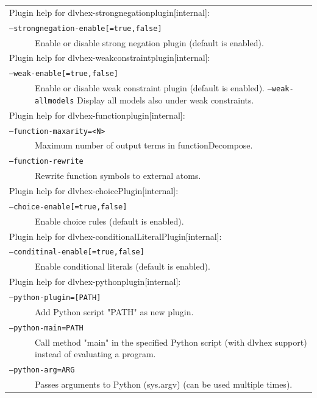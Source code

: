 \documentclass[a4paper, titlepage]{article}
\begin{document}
\begin{center}
\begin{longtable}{p{2.2cm}  p{2.5cm} p{0.6cm} p{6.3cm}  }
\multicolumn{4}{l}{Plugin help for dlvhex-strongnegationplugin[internal]:}\\
\multicolumn{4}{l}{\texttt{--strongnegation-enable[=true,false]}}\\
& & & Enable or disable strong negation plugin (default is enabled).\\ 
\multicolumn{4}{l}{Plugin help for dlvhex-weakconstraintplugin[internal]:}\\
\multicolumn{4}{l}{\texttt{--weak-enable[=true,false]}}\\
& & & Enable or disable weak constraint plugin (default is enabled). \texttt{--weak-allmodels} Display all models also under weak constraints.\\ 
\multicolumn{4}{l}{Plugin help for dlvhex-functionplugin[internal]:}\\
\multicolumn{4}{l}{\texttt{--function-maxarity=<N>}}\\
& & & Maximum number of output terms in functionDecompose.\\ 
\multicolumn{4}{l}{\texttt{--function-rewrite}}\\
& & & Rewrite function symbols to external atoms.\\ 
\multicolumn{4}{l}{Plugin help for dlvhex-choicePlugin[internal]:}\\
\multicolumn{4}{l}{\texttt{--choice-enable[=true,false]}}\\
& & & Enable choice rules (default is enabled).\\
\multicolumn{4}{l}{Plugin help for dlvhex-conditionalLiteralPlugin[internal]:}\\
\multicolumn{4}{l}{\texttt{--conditinal-enable[=true,false]}}\\
& & & Enable conditional literals (default is enabled).\\
\multicolumn{4}{l}{Plugin help for dlvhex-pythonplugin[internal]:}\\
\multicolumn{4}{l}{\texttt{--python-plugin=[PATH]}}\\
& & & Add Python script "PATH" as new plugin.\\
\multicolumn{4}{l}{\texttt{--python-main=PATH}}\\
& & & Call method "main" in the specified Python script (with dlvhex support) instead of evaluating a program.\\
\multicolumn{4}{l}{\texttt{--python-arg=ARG}}\\
& & &Passes arguments to Python (sys.argv) (can be used multiple times).\\

\end{longtable}
\end{center}
\end{document}
